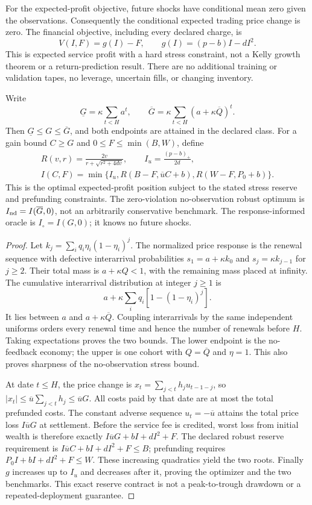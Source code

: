 For the expected-profit objective, future shocks have conditional mean zero
given the observations. Consequently the conditional expected trading price
change is zero. The financial objective, including every declared charge, is
\[
 V(I,F)=g(I)-F,\qquad g(I)=(p-b)I-dI^2.
\]
This is expected service profit with a hard stress constraint, not a Kelly
growth theorem or a return-prediction result. There are no additional training
or validation tapes, no leverage, uncertain fills, or changing inventory.

\begin{lemma}\label{fhc:capacity}
Write
\[
 \underline G=\kappa\sum_{t<H}a^t,\qquad
 \overline G=\kappa\sum_{t<H}(a+\kappa\overline Q)^t.
\]
Then $\underline G\le G\le\overline G$, and both endpoints are attained
in the declared class. For a gain bound $C\ge G$ and
$0\le F\le\min(B,W)$, define
\[
 \begin{gathered}
 R(v,r)=\frac{2v}{r+\sqrt{r^2+4dv}},\qquad I_u=\frac{(p-b)_+}{2d},\\
 I(C,F)=\min\{I_u,R(B-F,\overline u C+b),R(W-F,P_0+b)\}.
 \end{gathered}
\]
This is the optimal expected-profit position subject to the stated stress
reserve and prefunding constraints. The zero-violation no-observation robust optimum is
$I_{\rm nd}=I(\overline G,0)$, not an arbitrarily conservative benchmark.
The response-informed oracle is $I_\circ=I(G,0)$; it knows no future shocks.
\end{lemma}

\begin{proof}
Let $k_j=\sum_iq_i\eta_i(1-\eta_i)^j$. The normalized price response is
the renewal sequence with defective interarrival probabilities
$s_1=a+\kappa k_0$ and $s_j=\kappa k_{j-1}$ for $j\ge2$.
Their total mass is $a+\kappa Q<1$, with the remaining mass placed at
infinity. The cumulative interarrival distribution at integer $j\ge1$ is
\[
 a+\kappa\sum_iq_i[1-(1-\eta_i)^j].
\]
It lies between $a$ and $a+\kappa\overline Q$. Coupling interarrivals by
the same independent uniforms orders every renewal time and hence the
number of renewals before $H$. Taking expectations proves the two bounds.
The lower endpoint is the no-feedback economy; the upper is one cohort
with $Q=\overline Q$ and $\eta=1$. This also proves sharpness of the
no-observation stress bound.

At date $t\le H$, the price change is
$x_t=\sum_{j<t}h_j u_{t-1-j}$, so
$|x_t|\le\overline u\sum_{j<t}h_j\le\overline uG$.
All costs paid by that date are at most the total prefunded costs.
The constant adverse sequence $u_t=-\overline u$ attains the total price
loss $I\overline uG$ at settlement. Before the service fee is credited,
worst loss from initial wealth is therefore exactly
$I\overline uG+bI+dI^2+F$. The declared robust reserve requirement is
$I\overline uC+bI+dI^2+F\le B$; prefunding requires
$P_0I+bI+dI^2+F\le W$. These increasing quadratics yield the two roots.
Finally $g$ increases up to $I_u$ and decreases after it, proving the
optimizer and the two benchmarks. This exact reserve contract is not a
peak-to-trough drawdown or a repeated-deployment guarantee.
\end{proof}

